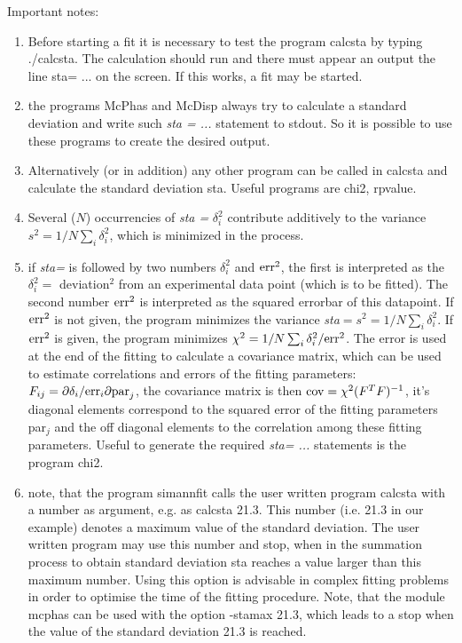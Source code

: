 Important notes:
\begin{enumerate}
\item
Before starting a fit it is necessary to test the program {\prg calcsta} by typing
{\prg ./calcsta}. The calculation should run and there must appear an output
the line {\prg sta= ...} on the screen. If this works, a fit may be started.
\item the programs {\prg McPhas} and {\prg McDisp} always try to
calculate a standard deviation and write such {\em sta = ...} statement
to stdout.  So it is possible to use these programs to create the desired output.
\item
 Alternatively (or in addition)
any other program can be called in {\prg calcsta} and calculate the 
standard deviation {\prg sta}. Useful  programs are {\prg chi2},
{\prg rpvalue}.
\item Several ($N$) occurrencies of {\em sta = } $\delta_i^2$  contribute additively to
the variance $s^2=1/N\sum_i \delta_i^2$, which is minimized in the process.
\item
if {\em sta=} is followed by two numbers $\delta_i^2$ and ${\rm err}^2$, the first is interpreted as the 
 $\delta_i^2=$ deviation$^2$ from an experimental data point (which is to be fitted).
The second number ${\rm err}^2$  is interpreted as the squared errorbar of this 
datapoint. If ${\rm err}^2$ is not given, the program minimizes the variance
{\em sta}$=s^2=1/N\sum_i \delta_i^2$.
If ${\rm err}^2$ is given, the program minimizes $\chi^2=1/N\sum_i \delta_i^2/{\rm err}^2$.
The error is used at the end of the fitting to calculate
a covariance matrix, which can be used to estimate correlations
and errors of the fitting parameters: $F_{ij}=\partial \delta_i / {\rm err}_i\partial {\rm par}_j$,
the covariance matrix is then ${\rm cov}=\chi^2(F^TF)^{-1}$, it's diagonal elements correspond
to the squared error of the fitting parameters par$_j$ and the off diagonal elements to
the correlation among these fitting parameters.  Useful to generate
the required {\em sta= ...} statements is the program {\prg chi2}.
\item
 note, that the program {\prg simannfit} calls the user written program
{\prg calcsta} with a number as argument, e.g. as {\prg calcsta 21.3}. This number
(i.e. 21.3 in our example) denotes a maximum value of the standard deviation. The
user written program may use this number and stop, when in the summation process
to obtain standard deviation {\prg sta} reaches a value larger than this maximum
number. Using this option is advisable in complex fitting problems in order to
optimise the time of the fitting procedure. Note, that the module {\prg mcphas}
can be used with the option {\prg -stamax 21.3}, which leads to a stop when the value of 
the standard deviation 21.3 is reached. 
\end{enumerate}

